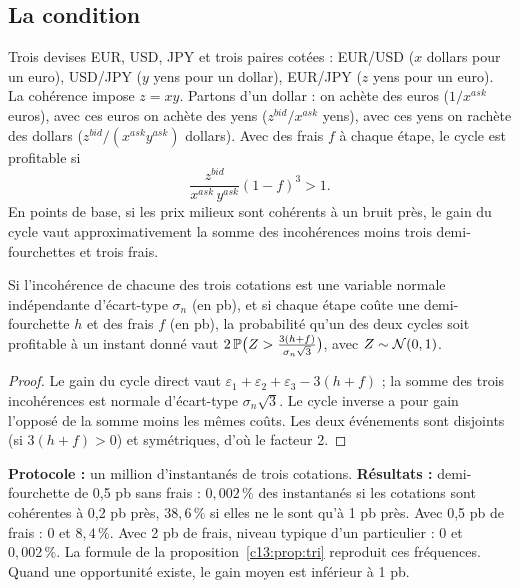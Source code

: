 \subsection{La condition}

Trois devises EUR, USD, JPY et trois paires cotées : EUR/USD ($x$ dollars pour un euro), USD/JPY ($y$ yens pour un dollar), EUR/JPY ($z$ yens pour un euro). La cohérence impose $z = xy$. Partons d'un dollar : on achète des euros ($1/x^{ask}$ euros), avec ces euros on achète des yens ($z^{bid}/x^{ask}$ yens), avec ces yens on rachète des dollars ($z^{bid}/(x^{ask}y^{ask})$ dollars). Avec des frais $f$ à chaque étape, le cycle est profitable si
\[
\frac{z^{bid}}{x^{ask}\,y^{ask}}(1-f)^3 > 1.
\]
En points de base, si les prix milieux sont cohérents à un bruit près, le gain du cycle vaut approximativement la somme des incohérences moins trois demi-fourchettes et trois frais.

\begin{proposition}\label{c13:prop:tri}
Si l'incohérence de chacune des trois cotations est une variable normale indépendante d'écart-type $\sigma_n$ (en pb), et si chaque étape coûte une demi-fourchette $h$ et des frais $f$ (en pb), la probabilité qu'un des deux cycles soit profitable à un instant donné vaut $2\,\mathbb{P}\big(Z > \frac{3(h+f)}{\sigma_n\sqrt3}\big)$, avec $Z\sim\mathcal{N}(0,1)$.
\end{proposition}
\begin{proof}
Le gain du cycle direct vaut $\varepsilon_1+\varepsilon_2+\varepsilon_3 - 3(h+f)$ ; la somme des trois incohérences est normale d'écart-type $\sigma_n\sqrt3$. Le cycle inverse a pour gain l'opposé de la somme moins les mêmes coûts. Les deux événements sont disjoints (si $3(h+f)>0$) et symétriques, d'où le facteur 2.
\end{proof}

\begin{codebox}
\textbf{Protocole :} un million d'instantanés de trois cotations. \textbf{Résultats :} demi-fourchette de 0,5 pb sans frais : $0{,}002\,\%$ des instantanés si les cotations sont cohérentes à 0,2 pb près, $38{,}6\,\%$ si elles ne le sont qu'à 1 pb près. Avec 0,5 pb de frais : 0 et $8{,}4\,\%$. Avec 2 pb de frais, niveau typique d'un particulier : $0$ et $0{,}002\,\%$. La formule de la proposition~\ref{c13:prop:tri} reproduit ces fréquences. Quand une opportunité existe, le gain moyen est inférieur à 1 pb.
\end{codebox}

